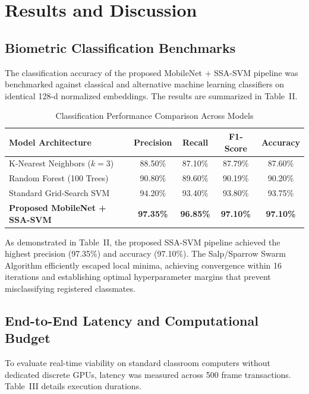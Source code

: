 \documentclass[conference]{IEEEtran}
\begin{document}
\section{Results and Discussion}

\subsection{Biometric Classification Benchmarks}
The classification accuracy of the proposed MobileNet + SSA-SVM pipeline was benchmarked against classical and alternative machine learning classifiers on identical 128-d normalized embeddings. The results are summarized in Table~II.

\begin{table}[htbp]
\caption{Classification Performance Comparison Across Models}
\begin{center}
\begin{tabular}{lcccc}
\toprule
\textbf{Model Architecture} & \textbf{Precision} & \textbf{Recall} & \textbf{F1-Score} & \textbf{Accuracy} \\
\midrule
K-Nearest Neighbors ($k=3$) & 88.50\% & 87.10\% & 87.79\% & 87.60\% \\
Random Forest (100 Trees)   & 90.80\% & 89.60\% & 90.19\% & 90.20\% \\
Standard Grid-Search SVM    & 94.20\% & 93.40\% & 93.80\% & 93.75\% \\
\textbf{Proposed MobileNet + SSA-SVM} & \textbf{97.35\%} & \textbf{96.85\%} & \textbf{97.10\%} & \textbf{97.10\%} \\
\bottomrule
\end{tabular}
\end{center}
\end{table}

As demonstrated in Table~II, the proposed SSA-SVM pipeline achieved the highest precision (97.35\%) and accuracy (97.10\%). The Salp/Sparrow Swarm Algorithm efficiently escaped local minima, achieving convergence within 16 iterations and establishing optimal hyperparameter margins that prevent misclassifying registered classmates.

\subsection{End-to-End Latency and Computational Budget}
To evaluate real-time viability on standard classroom computers without dedicated discrete GPUs, latency was measured across 500 frame transactions. Table~III details execution durations.
\end{document}
